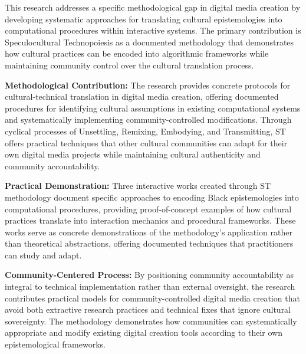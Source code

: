 This research addresses a specific methodological gap in digital media creation by developing systematic approaches for translating cultural epistemologies into computational procedures within interactive systems. The primary contribution is Speculocultural Technopoiesis as a documented methodology that demonstrates how cultural practices can be encoded into algorithmic frameworks while maintaining community control over the cultural translation process.

\textbf{Methodological Contribution:} The research provides concrete protocols for cultural-technical translation in digital media creation, offering documented procedures for identifying cultural assumptions in existing computational systems and systematically implementing community-controlled modifications. Through cyclical processes of Unsettling, Remixing, Embodying, and Transmitting, ST offers practical techniques that other cultural communities can adapt for their own digital media projects while maintaining cultural authenticity and community accountability.

\textbf{Practical Demonstration:} Three interactive works created through ST methodology document specific approaches to encoding Black epistemologies into computational procedures, providing proof-of-concept examples of how cultural practices translate into interaction mechanics and procedural frameworks. These works serve as concrete demonstrations of the methodology's application rather than theoretical abstractions, offering documented techniques that practitioners can study and adapt.

\textbf{Community-Centered Process:} By positioning community accountability as integral to technical implementation rather than external oversight, the research contributes practical models for community-controlled digital media creation that avoid both extractive research practices and technical fixes that ignore cultural sovereignty. The methodology demonstrates how communities can systematically appropriate and modify existing digital creation tools according to their own epistemological frameworks.